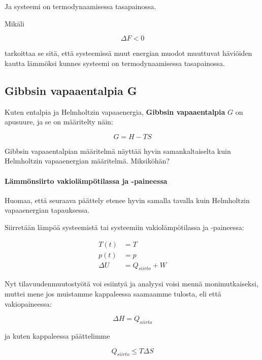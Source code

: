 \documentclass[12pt,a4paper,finnish]{book}
\begin{document}
Ja systeemi on termodynaamisessa tasapainossa.

Mikäli

\begin{equation}
 \Delta F < 0
\end{equation}

tarkoittaa se sitä, että systeemissä muut energian muodot muuttuvat häviöiden kautta lämmöksi 
kunnes systeemi on termodynaamisessa tasapainossa.

\subsection{Gibbsin vapaaentalpia G}

Kuten entalpia ja Helmholtzin vapaaenergia, \textbf{Gibbsin vapaaentalpia} $G$ on apusuure, 
ja se on määritelty näin:

\begin{equation}
 G = H - TS
\end{equation}

Gibbsin vapaaentalpian määritelmä näyttää hyvin samankaltaiselta kuin Helmholtzin vapaaenergian määritelmä. 
Miksiköhän?

\paragraph{Lämmönsiirto vakiolämpötilassa ja -paineessa}

Huomaa, että seuraava päättely etenee hyvin samalla tavalla kuin Helmholtzin vapaaenergian tapauksessa.

Siirretään lämpöä systeemistä tai systeemiin vakiolämpötilassa ja -paineessa:

\begin{align}
 T(t) & = T\\
 p(t) & = p\\
 \Delta U & = Q_{siirto} + W
\end{align}

Nyt tilavuudenmuutostyötä voi esiintyä ja analyysi voisi mennä monimutkaiseksi, muttei mene jos muistamme 
kappaleessa  saamaamme tulosta, eli että vakiopaineessa:

\begin{equation}
 \Delta H = Q_{siirto}
\end{equation}

ja kuten kappaleessa  päättelimme

\begin{equation}
 Q_{siirto} \leq T \Delta S
\end{equation}
\end{document}
